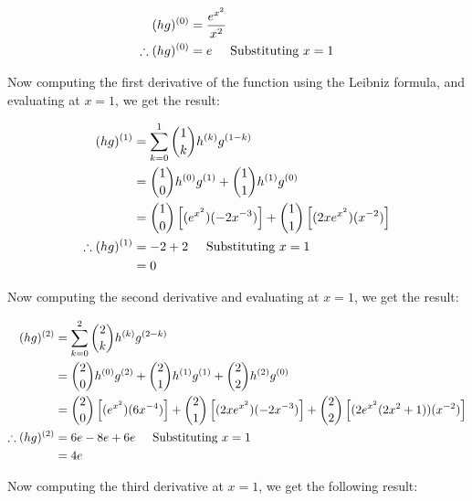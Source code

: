 \documentclass[a4paper]{article}
\begin{document}
\begin{enumerate}[label=\textbf{\arabic*.}]
\begin{enumerate}
		\begin{align*}
		(hg)^{(0)} & = \frac{e^{x^2}}{x^2}\\
		\therefore (hg)^{(0)} & = e \hspace{5mm} \text{Substituting } x = 1\\
		\end{align*}

		\pagebreak

		Now computing the first derivative of the function using the Leibniz formula, and evaluating at $x=1$, we get the result:

		\begin{align*}
		(hg)^{(1)} & = \sum_{k = 0}^{1}
		\binom{1}{k} h^{(k)}g^{(1-k)}\\
		& = \binom{1}{0}h^{(0)}g^{(1)} + \binom{1}{1}h^{(1)}g^{(0)}\\
		& = \binom{1}{0}\left[(e^{x^2})(-2x^{-3})\right] + \binom{1}{1}\left[(2xe^{x^2})(x^{-2})\right]\\
		\therefore (hg)^{(1)} & = -2 + 2 \hspace{5mm} \text{Substituting } x = 1\\
		& = 0\\
		\end{align*}

		Now computing the second derivative and evaluating at $x=1$, we get the result:

		\begin{align*}
		(hg)^{(2)} & = \sum_{k = 0}^{2}
		\binom{2}{k} h^{(k)}g^{(2-k)}\\
		& = \binom{2}{0}h^{(0)}g^{(2)} + \binom{2}{1}h^{(1)}g^{(1)} + \binom{2}{2}h^{(2)}g^{(0)}\\
		& = \binom{2}{0}\left[(e^{x^2})(6x^{-4})\right] + \binom{2}{1}\left[(2xe^{x^2})(-2x^{-3})\right] + \binom{2}{2}\left[(2e^{x^2}(2x^2+1))(x^{-2})\right]\\
		\therefore (hg)^{(2)} & = 6e -8e + 6e \hspace{5mm} \text{Substituting } x = 1\\
		& = 4e\\
		\end{align*}

		Now computing the third derivative at $x=1$, we get the following result:


\end{enumerate}
\end{enumerate}
\end{document}
